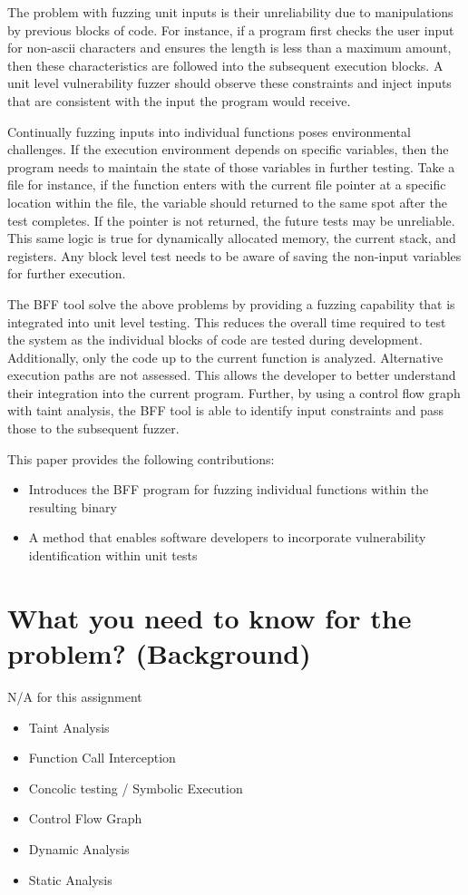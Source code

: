 \documentclass[conference]{IEEEtran}
\begin{document}
The problem with fuzzing unit inputs is their unreliability due to manipulations by previous blocks of code. For instance, if a program first checks the user input for non-ascii characters and ensures the length is less than a maximum amount, then these characteristics are followed into the subsequent execution blocks. A unit level vulnerability fuzzer should observe these constraints and inject inputs that are consistent with the input the program would receive. 

Continually fuzzing inputs into individual functions poses environmental challenges. If the execution environment depends on specific variables, then the program needs to maintain the state of those variables in further testing. Take a file for instance, if the function enters with the current file pointer at a specific location within the file, the variable should returned to the same spot after the test completes. If the pointer is not returned, the future tests may be unreliable. This same logic is true for dynamically allocated memory, the current stack, and registers. Any block level test needs to be aware of saving the non-input variables for further execution.

The BFF tool solve the above problems by providing a fuzzing capability that is integrated into unit level testing. This reduces the overall time required to test the system as the individual blocks of code are tested during development. Additionally, only the code up to the current function is analyzed. Alternative execution paths are not assessed. This allows the developer to better understand their integration into the current program. Further, by using a control flow graph with taint analysis, the BFF tool is able to identify input constraints and pass those to the subsequent fuzzer. 

This paper provides the following contributions:
\begin{itemize}
\item Introduces the BFF program for fuzzing individual functions within the resulting binary
\item A method that enables software developers to incorporate vulnerability identification within unit tests
\end{itemize}


\section{What you need to know for the problem? (Background)}
N/A for this assignment
\begin{itemize}
\item Taint Analysis
\item Function Call Interception
\item Concolic testing / Symbolic Execution
\item Control Flow Graph
\item Dynamic Analysis
\item Static Analysis
\end{itemize}
\end{document}
